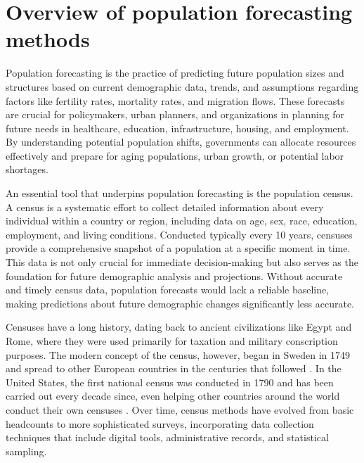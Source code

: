 \section{Overview of population forecasting methods}

Population forecasting is the practice of predicting future population sizes and structures based on current demographic data, trends, and assumptions regarding factors like fertility rates, mortality rates, and migration flows. These forecasts are crucial for policymakers, urban planners, and organizations in planning for future needs in healthcare, education, infrastructure, housing, and employment. By understanding potential population shifts, governments can allocate resources effectively and prepare for aging populations, urban growth, or potential labor shortages.

An essential tool that underpins population forecasting is the population census. A census is a systematic effort to collect detailed information about every individual within a country or region, including data on age, sex, race, education, employment, and living conditions. Conducted typically every 10 years, censuses provide a comprehensive snapshot of a population at a specific moment in time. This data is not only crucial for immediate decision-making but also serves as the foundation for future demographic analysis and projections. Without accurate and timely census data, population forecasts would lack a reliable baseline, making predictions about future demographic changes significantly less accurate.

Censuses have a long history, dating back to ancient civilizations like Egypt and Rome, where they were used primarily for taxation and military conscription purposes. The modern concept of the census, however, began in Sweden in 1749 and spread to other European countries in the centuries that followed \cite{BirthOfModernCensusInSweden}. In the United States, the first national census was conducted in 1790 and has been carried out every decade since, even helping other countries around the world conduct their own censuses \cite{UsaHelpingOthersWithCensuses}. Over time, census methods have evolved from basic headcounts to more sophisticated surveys, incorporating data collection techniques that include digital tools, administrative records, and statistical sampling.

